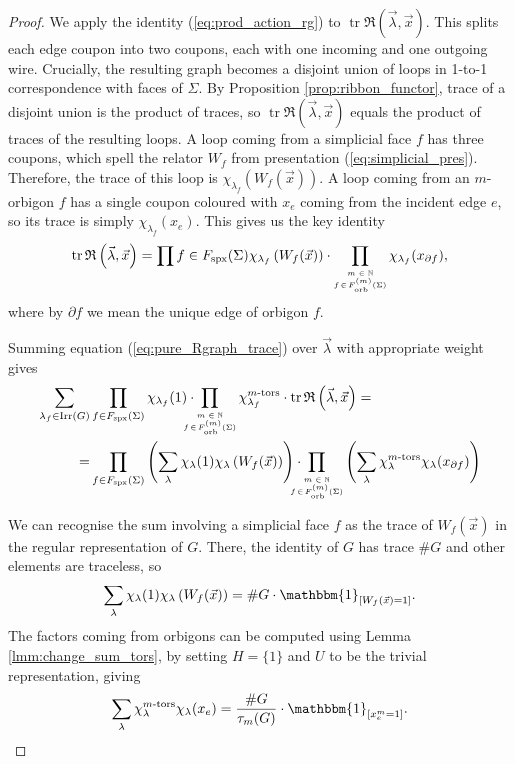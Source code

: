 \documentclass{amsart}
\newcommand{\Fspx}{F_{\textnormal{spx}}}
\newcommand{\Forb}[1][m]{F^{(#1)}_{\textnormal{orb}}}
\newcommand{\iterorb}{{\tiny\begin{matrix}m\in\mathbb{N}\\f\!\in\!\Forb(\Sigma)\end{matrix}}}
\newcommand{\tn}{\textnormal}
\newcommand{\tr}{\operatorname{tr}}
\begin{document}
\begin{proof}
We apply the identity (\ref{eq:prod_action_rg}) to $\tr\mathfrak{R}(\vec\lambda,\vec{x})$. This splits each edge coupon into two coupons, each with one incoming and one outgoing wire. Crucially, the resulting graph becomes a disjoint union of loops in 1-to-1 correspondence with faces of $\Sigma$. By Proposition \ref{prop:ribbon_functor}, trace of a disjoint union is the product of traces, so $\tr\mathfrak{R}(\vec\lambda,\vec{x})$ equals the product of traces of the resulting loops. A loop coming from a simplicial face $f$ has three coupons, which spell the relator $W_f$ from presentation (\ref{eq:simplicial_pres}). Therefore, the trace of this loop is $\chi_{\lambda_f}\left(W_f(\vec{x})\right)$. A loop coming from an $m$-orbigon $f$ has a single coupon coloured with $x_e$ coming from the incident edge $e$, so its trace is simply $\chi_{\lambda_f}(x_e)$. This gives us the key identity
\begin{equation}\label{eq:pure_Rgraph_trace}
\tr\mathfrak{R}\left(\vec\lambda,\vec{x}\right)=\prod{f\in\Fspx(\Sigma)}\chi_{\lambda_f}\left(W_f(\vec{x})\right)\cdot\prod_\iterorb\chi_{\lambda_f}(x_{\partial f}),
\end{equation}
where by $\partial f$ we mean the unique edge of orbigon $f$.

Summing equation (\ref{eq:pure_Rgraph_trace}) over $\vec\lambda$ with appropriate weight gives
\begin{align}\begin{split}\label{eq:summed_to_reg}
\sum_{\lambda_f\in\tn{Irr}(G)}&\prod_{f\in\Fspx(\Sigma)}\chi_{\lambda_f}(1)\cdot\hspace*{-10pt}\prod_\iterorb\chi_{\lambda_f}^{m\tn{-tors}}\cdot\tr\mathfrak{R}\left(\vec\lambda,\vec{x}\right)=\\
=&\prod_{f \in\Fspx(\Sigma)}\left(\sum_\lambda\chi_\lambda(1)\chi_\lambda\left(W_f(\vec{x})\right)\right)\cdot\hspace*{-10pt}\prod_\iterorb\left(\sum_\lambda\chi_\lambda^{m\tn{-tors}}\chi_\lambda(x_{\partial f})\right)
\end{split}\end{align}

We can recognise the sum involving a simplicial face $f$ as the trace of $W_f(\vec{x})$ in the regular representation of $G$. There, the identity of $G$ has trace $\#G$ and other elements are traceless, so
\begin{equation}\label{eq:reg_from_trRg}
\sum_\lambda\chi_\lambda(1)\chi_\lambda\left(W_f(\vec{x})\right)=\#G\cdot\mathbbm{1}_{[W_f(\vec{x})=1]}.
\end{equation}
The factors coming from orbigons can be computed using Lemma \ref{lmm:change_sum_tors}, by setting $H=\{1\}$ and $U$ to be the trivial representation, giving
\begin{equation}\label{eq:trRg_tors}
\sum_\lambda\chi_\lambda^{m\tn{-tors}}\chi_\lambda(x_e)=\frac{\#G}{\tau_m(G)}\cdot\mathbbm{1}_{[x_e^m=1]}.
\end{equation}


\end{proof}
\end{document}
